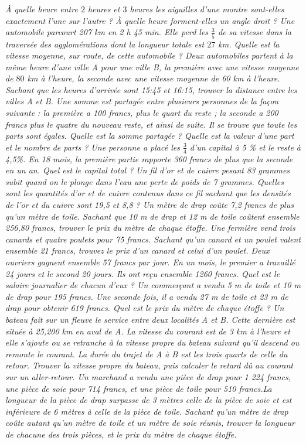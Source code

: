 \begin{itemize}
 \it À quelle heure entre $2$ heures et $3$ heures les aiguilles d'une montre sont-elles exactement l'une sur l'autre ? À quelle heure forment-elles un angle droit ? 
 \it Une automobile parcourt 207 km en 2 h 45 min. Elle perd les $\frac35$ de sa vitesse dans la traversée des agglomérations dont la longueur totale est $27$ km. Quelle est la vitesse moyenne, sur route, de cette automobile ? 
 \it Deux automobiles partent à la même heure d'une ville A pour une ville B, la première avec une vitesse moyenne de $80$ km à l'heure, la seconde avec une vitesse moyenne de 60 km à l'heure. Sachant que les heures d'arrivée sont 15:45 et 16:15, trouver la distance entre les villes A et B. 
 \it Une somme est partagée entre plusieurs personnes de la façon suivante : la première a 100 francs, plus le quart du reste ; la seconde a 200 francs plus le quatre du nouveau reste, et ainsi de suite. Il se trouve que toute les parts sont égales. Quelle est la somme partagée ? Quelle est la valeur d'une part et le nombre de parts ? 
 \it Une personne a placé les $\frac34$ d'un capital à 5 \% et le reste à 4,5\%. En 18 mois, la première partie rapporte 360 francs de plus que la seconde en un an. Quel est le capital total ? 
 \it Un fil d'or et de cuivre pesant 83 grammes subit quand on le plonge dans l'eau une perte de poids de 7 grammes. Quelles sont les quantités d'or et de cuivre contenus dans ce fil sachant que les densités de l'or et du cuivre sont 19,5 et 8,8 ?
 \it Un mètre de drap coûte 7,2 francs de plus qu'un mètre de toile. Sachant que 10 m de drap et 12 m de toile coûtent ensemble 256,80 francs, trouver le prix du mètre de chaque étoffe. 
 \it Une fermière vend trois canards et quatre poulets pour 75 francs. Sachant qu'un canard et un poulet valent ensemble 21 francs, trouvez le prix d'un canard et celui d'un poulet. 
 \it Deux ouvriers gagnent ensemble 57 francs par jour. En un mois, le premier a travaillé 24 jours et le second 20 jours. Ils ont reçu ensemble 1260 francs. Quel est le salaire journalier de chacun d'eux ? 
 \it Un commerçant a vendu 5 m de toile et 10 m de drap pour 195 francs. Une seconde fois, il a vendu 27 m de toile et 23 m de drap pour obtenir 619 francs. Quel est le prix du mètre de chaque étoffe ? 
 \it Un bateau fait sur un fleuve le service entre deux localités A et B. Cette dernière est située à 25,200 km en aval de A. La vitesse du courant est de 3 km à l'heure et elle s'ajoute ou se retranche à la vitesse propre du bateau suivant qu'il descend ou remonte le courant. La durée du trajet de A à B est les trois quarts de celle du retour. Trouver la vitesse propre du bateau, puis calculer le retard dû au courant sur un aller-retour. 
 \it Un marchand a vendu une pièce de drap pour 1 224 francs, une pièce de soie pour 714 francs, et une pièce de toile pour 510 francs.La longueur de la pièce de drap surpasse de 3 mètres celle de la pièce de soie et est inférieure de 6 mètres à celle de la pièce de toile. Sachant qu'un mètre de drap coûte autant qu'un mètre de toile et un mètre de soie réunis, trouver la longueur de chacune des trois pièces, et le prix du mètre de chaque étoffe. 
 \end{itemize}
